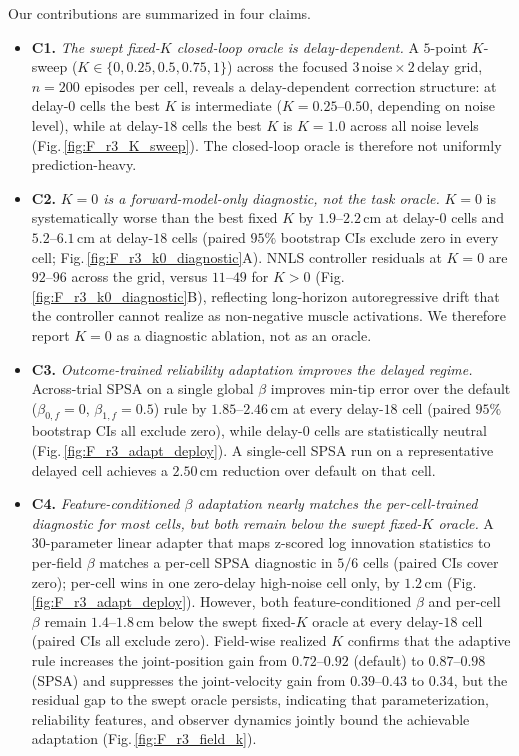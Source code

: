 \documentclass[sn-mathphys,NameDate,iicol]{sn-jnl}
\begin{document}
Our contributions are summarized in four claims.

\begin{itemize}
\item \textbf{C1.} \emph{The swept fixed-$K$ closed-loop oracle is
delay-dependent.} A $5$-point $K$-sweep
($K\!\in\!\{0,0.25,0.5,0.75,1\}$) across the focused
$3\,\mathrm{noise}\times\!2\,\mathrm{delay}$ grid, $n{=}200$ episodes
per cell, reveals a delay-dependent correction structure: at
delay-$0$ cells the best $K$ is intermediate
($K\!=\!0.25\text{--}0.50$, depending on noise level), while at
delay-$18$ cells the best $K$ is $K\!=\!1.0$ across all noise
levels (Fig.\,\ref{fig:F_r3_K_sweep}). The closed-loop oracle is
therefore not uniformly prediction-heavy.

\item \textbf{C2.} \emph{$K\!=\!0$ is a forward-model-only
diagnostic, not the task oracle.} $K\!=\!0$ is systematically worse
than the best fixed $K$ by $1.9\text{--}2.2$\,cm at delay-$0$ cells
and $5.2\text{--}6.1$\,cm at delay-$18$ cells (paired $95\%$
bootstrap CIs exclude zero in every cell; Fig.\,\ref{fig:F_r3_k0_diagnostic}A).
NNLS controller residuals at $K\!=\!0$ are $92\text{--}96$ across the
grid, versus $11\text{--}49$ for $K\!>\!0$
(Fig.\,\ref{fig:F_r3_k0_diagnostic}B), reflecting long-horizon
autoregressive drift that the controller cannot realize as
non-negative muscle activations. We therefore report $K\!=\!0$ as a
diagnostic ablation, not as an oracle.

\item \textbf{C3.} \emph{Outcome-trained reliability adaptation
improves the delayed regime.} Across-trial SPSA on a single global
$\beta$ improves min-tip error over the default
($\beta_{0,f}\!=\!0$, $\beta_{1,f}\!=\!0.5$) rule by
$1.85\text{--}2.46$\,cm at every delay-$18$ cell (paired $95\%$
bootstrap CIs all exclude zero), while delay-$0$ cells are
statistically neutral (Fig.\,\ref{fig:F_r3_adapt_deploy}). A
single-cell SPSA run on a representative delayed cell achieves a
$2.50$\,cm reduction over default on that cell.

\item \textbf{C4.} \emph{Feature-conditioned $\beta$ adaptation
nearly matches the per-cell-trained diagnostic for most cells, but
both remain below the swept fixed-$K$ oracle.} A
$30$-parameter linear adapter that maps z-scored log innovation
statistics to per-field $\beta$ matches a per-cell SPSA diagnostic in
$5/6$ cells (paired CIs cover zero); per-cell wins in
one zero-delay high-noise cell only, by $1.2$\,cm
(Fig.\,\ref{fig:F_r3_adapt_deploy}). However, both feature-conditioned
$\beta$ and per-cell $\beta$ remain $1.4\text{--}1.8$\,cm below the
swept fixed-$K$ oracle at every delay-$18$ cell (paired CIs all
exclude zero). Field-wise realized $K$ confirms that the adaptive
rule increases the joint-position gain from $0.72\text{--}0.92$
(default) to $0.87\text{--}0.98$ (SPSA) and suppresses the
joint-velocity gain from $0.39\text{--}0.43$ to $0.34$, but the
residual gap to the swept
oracle persists, indicating that parameterization, reliability
features, and observer dynamics jointly bound the achievable
adaptation (Fig.\,\ref{fig:F_r3_field_k}).
\end{itemize}
\end{document}
